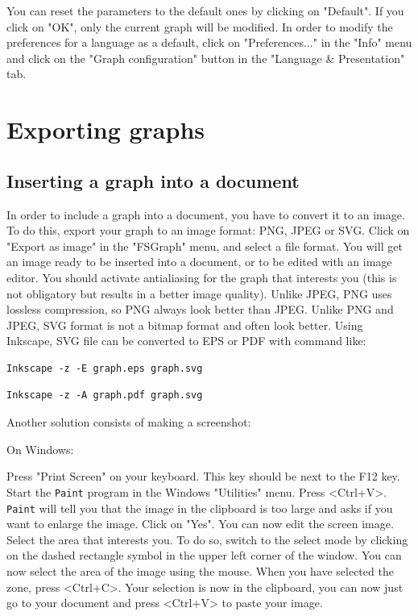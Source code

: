 \bigskip
\noindent You can reset the parameters to the default ones by clicking on
"Default". If you click on "OK", only the current graph will be modified.  In
order to modify the preferences for a language as a default, click on
"Preferences..." in the "Info" menu and click on the "Graph configuration" button 
in the "Language \& Presentation" tab.


\section{Exporting graphs}
\label{exporting-graphs}
\subsection{Inserting a graph into a document}
In order to include a graph into a document, you have to convert it to an image.
To do this, export your graph to an image format: PNG, JPEG or SVG. Click on "Export as image" in the
"FSGraph" menu, and select a file format. You will get an image ready to be
inserted into a document, or to be edited with an image editor. You should
activate antialiasing for the graph that interests you (this is not obligatory
but results in a better image quality). Unlike JPEG, PNG uses lossless compression, so
PNG always look better than JPEG. Unlike PNG and JPEG, SVG format is not a bitmap format and
often look better. Using Inkscape, SVG file can be converted to EPS or PDF with command like:
\begin{verbatim}
Inkscape -z -E graph.eps graph.svg
\end{verbatim}
\begin{verbatim}
Inkscape -z -A graph.pdf graph.svg
\end{verbatim}

\bigskip
\noindent Another solution consists of making a screenshot:

\bigskip
\noindent On Windows:

\bigskip
\noindent Press "Print Screen" on your keyboard. This key should be next to the
F12 key. Start the \verb+Paint+ program in the Windows "Utilities" menu. Press
<Ctrl+V>. \verb+Paint+ will tell you that the image in the clipboard is too large
and asks if you want to enlarge the image. Click on "Yes". You can now edit the
screen image. Select the area that interests you. To do so, switch to the select
mode by clicking on the dashed rectangle symbol in the upper left corner of the
window. You can now select the area of the image using the mouse. When you have
selected the zone, press <Ctrl+C>. Your selection is now in the clipboard, you
can now just go to your document and press <Ctrl+V> to paste your image.

